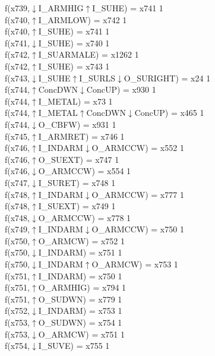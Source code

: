 f(x739,$\downarrow$I\_ARMHIG$\uparrow$I\_SUHE) = x741 {1} \\
f(x740,$\uparrow$I\_ARMLOW) = x742 {1} \\
f(x740,$\uparrow$I\_SUHE) = x741 {1} \\
f(x741,$\downarrow$I\_SUHE) = x740 {1} \\
f(x742,$\uparrow$I\_SUARMALE) = x1262 {1} \\
f(x742,$\uparrow$I\_SUHE) = x743 {1} \\
f(x743,$\downarrow$I\_SUHE$\uparrow$I\_SURLS$\downarrow$O\_SURIGHT) = x24 {1} \\
f(x744,$\uparrow$ConcDWN$\downarrow$ConcUP) = x930 {1} \\
f(x744,$\uparrow$I\_METAL) = x73 {1} \\
f(x744,$\uparrow$I\_METAL$\uparrow$ConcDWN$\downarrow$ConcUP) = x465 {1} \\
f(x744,$\downarrow$O\_CBFW) = x931 {1} \\
f(x745,$\uparrow$I\_ARMRET) = x746 {1} \\
f(x746,$\uparrow$I\_INDARM$\downarrow$O\_ARMCCW) = x552 {1} \\
f(x746,$\uparrow$O\_SUEXT) = x747 {1} \\
f(x746,$\downarrow$O\_ARMCCW) = x554 {1} \\
f(x747,$\downarrow$I\_SURET) = x748 {1} \\
f(x748,$\uparrow$I\_INDARM$\downarrow$O\_ARMCCW) = x777 {1} \\
f(x748,$\uparrow$I\_SUEXT) = x749 {1} \\
f(x748,$\downarrow$O\_ARMCCW) = x778 {1} \\
f(x749,$\uparrow$I\_INDARM$\downarrow$O\_ARMCCW) = x750 {1} \\
f(x750,$\uparrow$O\_ARMCW) = x752 {1} \\
f(x750,$\downarrow$I\_INDARM) = x751 {1} \\
f(x750,$\downarrow$I\_INDARM$\uparrow$O\_ARMCW) = x753 {1} \\
f(x751,$\uparrow$I\_INDARM) = x750 {1} \\
f(x751,$\uparrow$O\_ARMHIG) = x794 {1} \\
f(x751,$\uparrow$O\_SUDWN) = x779 {1} \\
f(x752,$\downarrow$I\_INDARM) = x753 {1} \\
f(x753,$\uparrow$O\_SUDWN) = x754 {1} \\
f(x753,$\downarrow$O\_ARMCW) = x751 {1} \\
f(x754,$\downarrow$I\_SUVE) = x755 {1} \\
